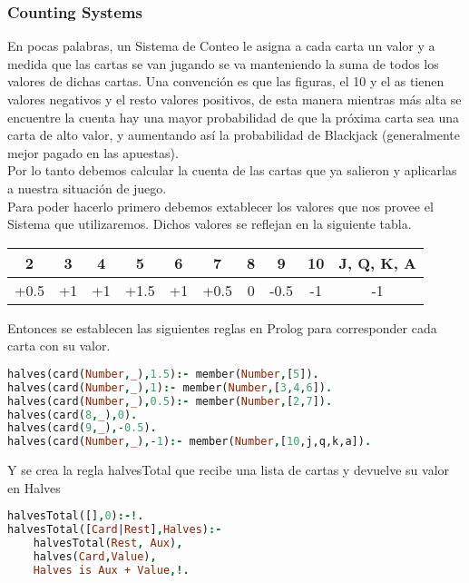 \documentclass[12pt]{report}
\begin{document}
\subsubsection*{Counting Systems}

En pocas palabras, un Sistema de Conteo le asigna a cada carta un valor y a medida que las cartas se van jugando se va manteniendo la suma de todos los valores de dichas cartas. Una convención es que las figuras, el 10 y el as tienen valores negativos y el resto valores positivos, de esta manera mientras más alta se encuentre la cuenta hay una mayor probabilidad de que la próxima carta sea una carta de alto valor, y aumentando así la probabilidad de Blackjack (generalmente mejor pagado en las apuestas).\\

Por lo tanto debemos calcular la cuenta de las cartas que ya salieron y aplicarlas a nuestra situación de juego.\\

Para poder hacerlo primero debemos extablecer los valores que nos provee el Sistema que utilizaremos. Dichos valores se reflejan en la siguiente tabla.

\begin{table}[!ht]\footnotesize
   \centering
   \begin{tabular}{cccccccccc}
       2 & 3 & 4 & 5 & 6 & 7 & 8 & 9 & 10 & J, Q, K, A \\
       \hline
       +0.5 & +1 & +1 & +1.5 & +1 & +0.5 & 0 & -0.5 & -1 & -1
   \end{tabular}
\end{table}

Entonces se establecen las siguientes reglas en Prolog para corresponder cada carta con su valor.

\begin{lstlisting}[language=Prolog]
halves(card(Number,_),1.5):- member(Number,[5]).
halves(card(Number,_),1):- member(Number,[3,4,6]).
halves(card(Number,_),0.5):- member(Number,[2,7]).
halves(card(8,_),0).
halves(card(9,_),-0.5).
halves(card(Number,_),-1):- member(Number,[10,j,q,k,a]).
\end{lstlisting}

Y se crea la regla halvesTotal que recibe una lista de cartas y devuelve su valor en Halves


\begin{lstlisting}[language=Prolog]
halvesTotal([],0):-!.
halvesTotal([Card|Rest],Halves):- 
    halvesTotal(Rest, Aux), 
    halves(Card,Value),
    Halves is Aux + Value,!.
\end{lstlisting}
\end{document}

